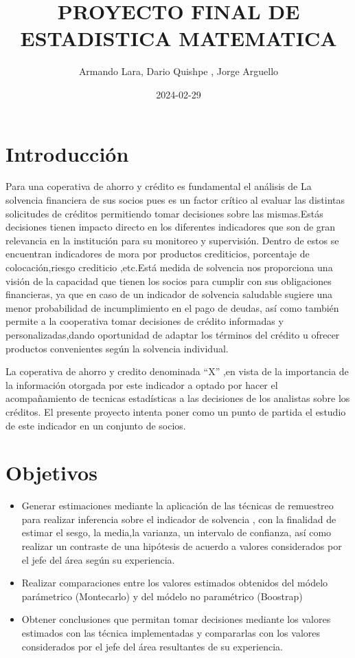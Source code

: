 \documentclass[
]{article}
\title{PROYECTO FINAL DE ESTADISTICA MATEMATICA}
\author{Armando Lara, Dario Quishpe , Jorge Arguello}
\date{2024-02-29}
\providecommand{\tightlist}{%
  \setlength{\itemsep}{0pt}\setlength{\parskip}{0pt}}
\begin{document}
\maketitle

{
\setcounter{tocdepth}{2}
\tableofcontents
}
\hypertarget{introducciuxf3n}{%
\section{Introducción}\label{introducciuxf3n}}

Para una coperativa de ahorro y crédito es fundamental el análisis de La
solvencia financiera de sus socios pues es un factor crítico al evaluar
las distintas solicitudes de créditos permitiendo tomar decisiones sobre
las mismas.Estás decisiones tienen impacto directo en los diferentes
indicadores que son de gran relevancia en la institución para su
monitoreo y supervisión. Dentro de estos se encuentran indicadores de
mora por productos crediticios, porcentaje de colocación,riesgo
crediticio ,etc.Está medida de solvencia nos proporciona una visión de
la capacidad que tienen los socios para cumplir con sus obligaciones
financieras, ya que en caso de un indicador de solvencia saludable
sugiere una menor probabilidad de incumplimiento en el pago de deudas,
así como también permite a la cooperativa tomar decisiones de crédito
informadas y personalizadas,dando oportunidad de adaptar los términos
del crédito u ofrecer productos convenientes según la solvencia
individual.

La coperativa de ahorro y credito denominada ``X'' ,en vista de la
importancia de la información otorgada por este indicador a optado por
hacer el acompañamiento de tecnicas estadísticas a las decisiones de los
analistas sobre los créditos. El presente proyecto intenta poner como un
punto de partida el estudio de este indicador en un conjunto de socios.

\hypertarget{objetivos}{%
\section{Objetivos}\label{objetivos}}

\begin{itemize}
\tightlist
\item
  Generar estimaciones mediante la aplicación de las técnicas de
  remuestreo para realizar inferencia sobre el indicador de solvencia ,
  con la finalidad de estimar el sesgo, la media,la varianza, un
  intervalo de confianza, así como realizar un contraste de una
  hipótesis de acuerdo a valores considerados por el jefe del área según
  su experiencia.
\item
  Realizar comparaciones entre los valores estimados obtenidos del
  módelo parámetrico (Montecarlo) y del módelo no paramétrico (Boostrap)
\item
  Obtener conclusiones que permitan tomar decisiones mediante los
  valores estimados con las técnica implementadas y compararlas con los
  valores considerados por el jefe del área resultantes de su
  experiencia.
\end{itemize}
\end{document}
